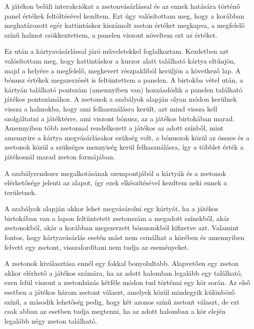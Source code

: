 
A játékon belüli interakciókat a zsetonvásárlással és az ennek hatására történő panel értékek feltöltésével kezdtem. Ezt úgy valósítottam meg, hogy a korábban meghatározott egér kattintáskor kiszámolt zseton értéket megkapva, a megfelelő színű halmot csökkentettem, a panelen viszont növeltem ezt az értéket.

Ez után a kártyavásárlással járó műveletekkel foglalkoztam. Kezdetben azt valósítottam meg, hogy kattintáskor a kurzor alatt található kártya eltűnjön, majd a helyére a megfelelő, megkevert részpakliból kerüljön a következő lap. A bónusz értékek megszerzését is feltüntettem a panelen. A birtokba vétel után, a kártyán található pontszám (amennyiben van) hozzáadódik a panelen található játékos pontszámához. A zsetonok a szabályok alapján olyan módon kerülnek vissza a halmokba, hogy ami felhasználásra került, azt mind vissza kell szolgáltatni a játéktérre, ami viszont bónusz, az a játékos birtokában marad. Amennyiben több zsetonnal rendelkezett a játékos az adott színből, mint amennyire a kártya megvásárlásakor szükség volt, a bónuszok közül az összes és a zsetonok közül a szükséges mennyiség kerül felhasználásra, így a többlet érték a játékosnál marad zseton formájában.


A szabályrendszer megalkotásának szempontjából a kártyák és a zsetonok elérhetősége jelenti az alapot, így ezek elkészítésével kezdtem neki ennek a területnek.

A szabályok alapján akkor lehet megvásárolni egy kártyát, ha a játékos birtokában van a lapon feltüntetett zsetonszám a megadott színekből, akár zsetonokból, akár a korábban megszerzett bónuszokból kifizetve azt. Valamint fontos, hogy kártyavásárlás esetén mást nem csinálhat a körében és amennyiben felvett egy zsetont, visszafordítani nem tudja az eseményeket.

A zsetonok kiválasztása ennél egy fokkal bonyolultabb. Alapvetően egy zseton akkor elérhető a játékos számára, ha az adott halomban legalább egy található, ezen felül viszont a zsetonhúzás kétféle módon tud történni egy kör során. Az első esetben a játékos három zsetont választ, amelyek közül mindegyik különböző színű, a második lehetőség pedig, hogy két azonos színű zsetont választ, de ezt csak abban az esetben tudja megtenni, ha az adott halomban a kör elején legalább négy zseton található.

